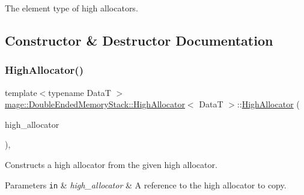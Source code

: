 The element type of high allocators. 

\subsection{Constructor \& Destructor Documentation}
\mbox{\label{classmage_1_1_double_ended_memory_stack_1_1_high_allocator_aaad727b10738064cffcb555252df5cfd}} 
\subsubsection{\texorpdfstring{High\+Allocator()}{HighAllocator()}\hspace{0.1cm}{\footnotesize\ttfamily [1/4]}}
{\footnotesize\ttfamily template$<$typename DataT $>$ \\
\mbox{\hyperlink{classmage_1_1_double_ended_memory_stack_1_1_high_allocator}{mage\+::\+Double\+Ended\+Memory\+Stack\+::\+High\+Allocator}}$<$ DataT $>$\+::\mbox{\hyperlink{classmage_1_1_double_ended_memory_stack_1_1_high_allocator}{High\+Allocator}} (\begin{DoxyParamCaption}\item[{const \mbox{\hyperlink{classmage_1_1_double_ended_memory_stack_1_1_high_allocator}{High\+Allocator}}$<$ DataT $>$ \&}]{high\+\_\+allocator }\end{DoxyParamCaption})\hspace{0.3cm}{\ttfamily [default]}, {\ttfamily [noexcept]}}

Constructs a high allocator from the given high allocator.


\begin{DoxyParams}[1]{Parameters}
\mbox{\tt in}  & {\em high\+\_\+allocator} & A reference to the high allocator to copy. \\
\hline
\end{DoxyParams}
\mbox{\label{classmage_1_1_double_ended_memory_stack_1_1_high_allocator_a9b036295101c4f271f30236b3cae9a1b}} 
